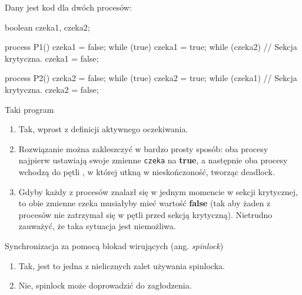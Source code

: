 \begin{solutions}
    \sol Dany jest kod dla dwóch procesów:
    \begin{java}
        boolean czeka1, czeka2;
        
        process P1() {
            czeka1 = false;
            while (true) {
                czeka1 = true;
                while (czeka2) {}
                // Sekcja krytyczna.
                czeka1 = false;
            }
        }
        
        process P2() {
            czeka2 = false;
            while (true) {
                czeka2 = true;
                while (czeka1) {}
                // Sekcja krytyczna.
                czeka2 = false;
            }
        }
    \end{java}
    Taki program

    \begin{enumerate}[\bf A.]
        \item Tak, wprost z definicji aktywnego oczekiwania.

        \item Rozwiązanie można zakleszczyć w bardzo prosty sposób: oba procesy najpierw ustawiają swoje zmienne \texttt{czeka} na \textbf{true}, a następnie oba procesy wchodzą do pętli , w której utkną w nieskończoność, tworząc deadlock.

        \item Gdyby każdy z procesów znalazł się w jednym momencie w sekcji krytycznej, to obie zmienne czeka musiałyby mieć wartość \textbf{false} (tak aby żaden z procesów nie zatrzymał się w pętli przed sekcją krytyczną). Nietrudno zauważyć, że taka sytuacja jest niemożliwa.
    \end{enumerate}

    \sol Synchronizacja za pomocą blokad wirujących (ang. \textit{spinlock})

    \begin{enumerate}[\bf A.]
        \item Tak, jest to jedna z nielicznych zalet używania spinlocka.

        \item Nie, spinlock może doprowadzić do zagłodzenia.


\end{enumerate}
\end{solutions}

